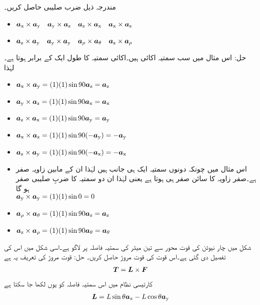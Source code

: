 
مندرجہ ذیل ضرب صلیبی حاصل کریں۔
\begin{itemize}
\item
$\ax \times \ay \quad \ay \times \az \quad \az \times \ax \quad \ax \times \az$ \\
\item
 $\az \times \ay \quad \ay \times \ay \quad \arho \times \atheta \quad \az \times \arho$
\end{itemize}

حل: اس مثال میں سب سمتیہ اکائی ہیں۔اکائی سمتیہ کا طول ایک کے برابر ہوتا ہے۔ لہٰذا
\begin{itemize}
\item
$\ax \times \ay=(1)(1) \sin 90 \az =\az$\\
\item
$\ay \times \az=(1)(1) \sin 90 \ax =\ax$\\
\item
$\az \times \ax=(1)(1) \sin 90 \ay =\ay$\\
\item
$\ax \times \az=(1)(1) \sin 90 (-\ay) =-\ay$\\
\item
$\az \times \ay=(1)(1) \sin 90 (-\ax) =-\ax$\\
\item
اس مثال میں چونکہ دونوں سمتیہ ایک ہی جانب ہیں لہٰذا ان کے مابین زاویہ صفر ہے۔صفر زاویہ کا سائن صفر ہی ہوتا ہے یعنی  لہٰذا ان دو سمتیہ کا ضربِ صلیبی صفر ہو گا\\
$\ay \times \ay=(1)(1) \sin 0  =0$\\
\item
$\arho \times \atheta=(1)(1) \sin 90  \az =\az$\\
\item
$\az \times \arho=(1)(1) \sin 90 \atheta =\atheta $\\
\end{itemize}
%
شکل  میں  چار نیوٹن کی قوت  محور سے تین میٹر کی سمتیہ فاصلہ   پر لاگو ہے۔اسی شکل میں اس کی تفصیل دی گئی ہے۔اس قوت کی قوت مروڑ  حاصل کریں۔
	حل:
	قوت مروڑ  کی تعریف یہ ہے
\begin{align}
\kvec{T}=\kvec{L} \times \kvec{F}
\end{align}
کارتیسی نظام میں اس سمتیہ فاصلہ کو یوں لکھا جا سکتا ہے
\begin{align}
\kvec{L}=L \sin \theta \ax-L \cos \theta \ay
\end{align}
